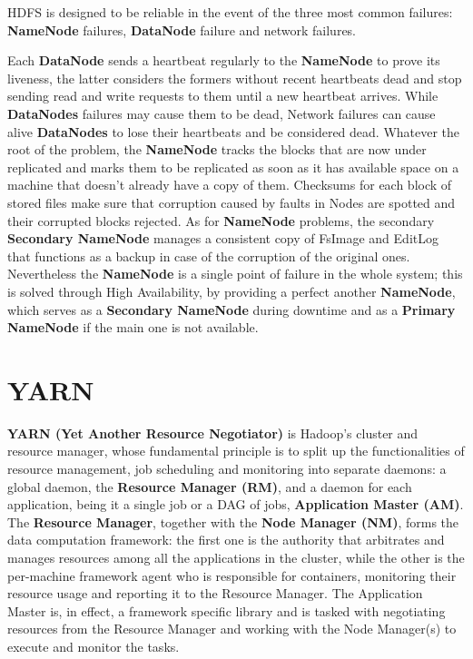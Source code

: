 HDFS is designed to be reliable in the event of the three most common failures: \textbf{NameNode} failures, \textbf{DataNode} failure and network failures.

Each \textbf{DataNode} sends a heartbeat regularly to the \textbf{NameNode} to prove its liveness, the latter considers the formers without recent heartbeats dead and stop sending read and write requests to them until a new heartbeat arrives.\newline
While \textbf{DataNodes} failures may cause them to be dead, Network failures can cause alive \textbf{DataNodes} to lose their heartbeats and be considered dead.\newline
Whatever the root of the problem, the \textbf{NameNode} tracks the blocks that are now under replicated and marks them to be replicated as soon as it has available space on a machine that doesn't already have a copy of them.\newline
Checksums for each block of stored files make sure that corruption caused by faults in Nodes are spotted and their corrupted blocks rejected.\newline
As for \textbf{NameNode} problems, the secondary \textbf{Secondary NameNode} manages a consistent copy of FsImage and EditLog that functions as a backup in case of the corruption of the original ones. Nevertheless the \textbf{NameNode} is a single point of failure in the whole system; this is solved through High Availability, by providing a perfect another \textbf{NameNode}, which serves as a \textbf{Secondary NameNode} during downtime and as a \textbf{Primary NameNode} if the main one is not available.

\pagebreak
\section{YARN} \label{YARN}

\textbf{YARN (Yet Another Resource Negotiator)} \cite{yarn_doc} is Hadoop's cluster and resource manager, whose fundamental principle is to split up the functionalities of resource management, job scheduling and monitoring into separate daemons: a global daemon, the \textbf{Resource Manager (RM)}, and a daemon for each application, being it a single job or a DAG of jobs, \textbf{Application Master (AM)}.
\newline\newline
The \textbf{Resource Manager}, together with the \textbf{Node Manager (NM)}, forms the data computation framework: the first one is the authority that arbitrates and manages resources among all the applications in the cluster, while the other is the per-machine framework agent who is responsible for containers, monitoring their resource usage and reporting it to the Resource Manager.
\newline\newline
The Application Master is, in effect, a framework specific library and is tasked with negotiating resources from the Resource Manager and working with the Node Manager(s) to execute and monitor the tasks.

